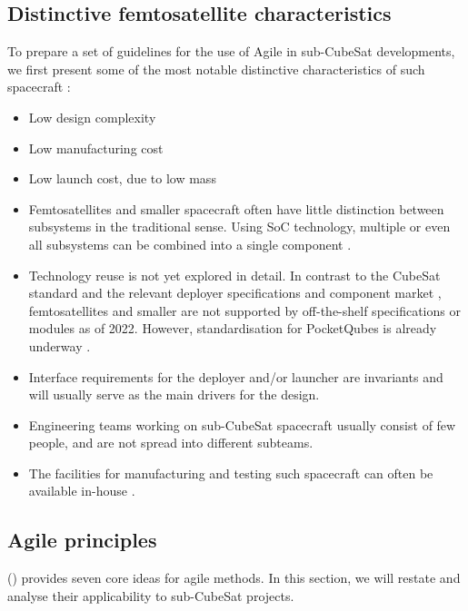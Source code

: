 \documentclass[]{iac}
\def\todo#1{}
\begin{document}
\subsection{Distinctive femtosatellite characteristics}

To prepare a set of guidelines for the use of Agile in sub-CubeSat developments, we first present some of the most notable distinctive characteristics of such spacecraft \autocite{hein_attosats_2019,barnhart_low-cost_2009,manchester_centimeter-scale_2015}:
\begin{itemize}[itemsep=0ex]
    \item Low design complexity %
    \item Low manufacturing cost
    \item Low launch cost, due to low mass
    \item Femtosatellites and smaller spacecraft often have little distinction between subsystems in the traditional sense. Using \acf*{SoC} technology, multiple or even all subsystems can be combined into a single component \autocite{wolf_multiprocessor_2008}.
    \item Technology reuse is not yet explored in detail. In contrast to the CubeSat standard and the relevant deployer specifications and component market \autocite{CDS14}, femtosatellites and smaller are not supported by off-the-shelf specifications or modules as of 2022. However, standardisation for PocketQubes is already underway \autocite{PQ1, PQ91}.
    \item Interface requirements for the deployer and/or launcher are invariants and will usually serve as the main drivers for the design.
    \item Engineering teams working on sub-CubeSat spacecraft usually consist of few people, and are not spread into different subteams.
    \item The facilities for manufacturing and testing such spacecraft can often be available in-house \autocite{triantafyllopoulou_qubik_2020}.
\end{itemize}

\subsection{Agile principles} \label{sec:agile_principles}

\citeauthor{douglass_agile_2015} (\citeyear{douglass_agile_2015}) \autocite{douglass_agile_2015} provides seven core ideas for agile methods. In this section, we will restate and analyse their applicability to sub-CubeSat projects.
\end{document}
